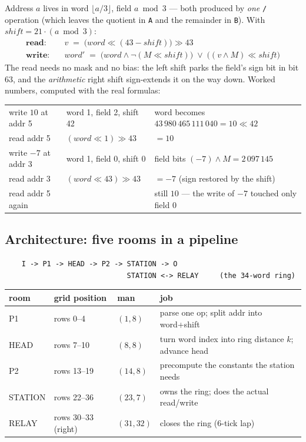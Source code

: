 \documentclass[11pt,a4paper]{article}
\newcommand{\op}[1]{\texttt{#1}}
\begin{document}
Address $a$ lives in word $\lfloor a/3\rfloor$, field $a\bmod 3$ --- both
produced by \emph{one} \op{/} operation (which leaves the quotient in \op{A}
and the remainder in \op{B}). With $\mathit{shift}=21\cdot(a\bmod3)$:
\begin{align*}
  \textbf{read:}\quad & v \;=\; \bigl(\mathit{word} \ll (43-\mathit{shift})\bigr) \gg 43\\
  \textbf{write:}\quad & \mathit{word}' \;=\;
     \bigl(\mathit{word} \wedge \lnot(M\ll \mathit{shift})\bigr)
     \;\vee\; \bigl((v\wedge M)\ll \mathit{shift}\bigr)
\end{align*}
The read needs no mask and no bias: the left shift parks the field's sign
bit in bit 63, and the \emph{arithmetic} right shift sign-extends it on the
way down. Worked numbers, computed with the real formulas:

\begin{center}
\begin{tabular}{lll}
write $10$ at addr 5 & word 1, field 2, shift 42 & word becomes $43\,980\,465\,111\,040 = 10\ll42$\\
read addr 5 & $(\mathit{word}\ll 1)\gg 43$ & $=10$\\
write $-7$ at addr 3 & word 1, field 0, shift 0 & field bits $(-7)\wedge M = 2\,097\,145$\\
read addr 3 & $(\mathit{word}\ll 43)\gg 43$ & $=-7$ \quad (sign restored by the shift)\\
read addr 5 again & & still $10$ --- the write of $-7$ touched only field 0\\
\end{tabular}
\end{center}

\subsection{Architecture: five rooms in a pipeline}

\begin{verbatim}
    I -> P1 -> HEAD -> P2 -> STATION -> O
                             STATION <-> RELAY     (the 34-word ring)
\end{verbatim}

\begin{center}
\small
\begin{tabular}{llll}
room & grid position & man & job\\ \hline
P1 & rows 0--4 & $(1,8)$ & parse one op; split addr into word+shift\\
HEAD & rows 7--10 & $(8,8)$ & turn word index into ring distance $k$; advance head\\
P2 & rows 13--19 & $(14,8)$ & precompute the constants the station needs\\
STATION & rows 22--36 & $(23,7)$ & owns the ring; does the actual read/write\\
RELAY & rows 30--33 (right) & $(31,32)$ & closes the ring (6-tick lap)\\
\end{tabular}
\end{center}
\end{document}
